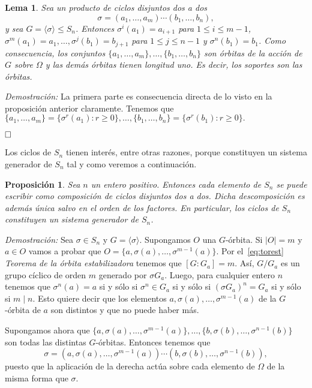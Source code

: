 \documentclass[12pt]{article}
\newtheorem{proposition}[theorem]{Proposición}
\newtheorem{lemma}{Lema}[theorem]
\begin{document}
\begin{lemma}Sea un producto de ciclos disjuntos dos a dos $$\sigma= (a_{1}, \ldots, a_{m}) \cdots (b_{1}, \ldots, b_{n}),$$ y sea $G =\langle \sigma \rangle \leq S_{n}$. Entonces $\sigma^{i}(a_{1}) = a_{i+1}$ para $1 \leq i \leq m-1$, $\sigma^{m}(a_{1})=a_{1}, \ldots, \sigma^{j}(b_{1})=b_{j+1}$ para $1 \leq j \leq n-1$ y $\sigma^{n}(b_{1})=b_{1}$. Como consecuencia, los conjuntos $\lbrace a_{1}, \ldots, a_{m} \rbrace, \ldots, \lbrace b_{1}, \ldots, b_{n}\rbrace$ son órbitas de la acción de $G$ sobre $\Omega$ y las demás órbitas tienen longitud uno. Es decir, los soportes son las órbitas.
\end{lemma}
\emph{Demostración: }
La primera parte es consecuencia directa de lo visto en la proposición anterior claramente. Tenemos que $\lbrace a_{1}, \ldots, a_{m} \rbrace = \lbrace \sigma^{r}(a_{1}) : r \geq 0 \rbrace, \ldots, \lbrace b_{1}, \ldots, b_{n} \rbrace = \lbrace \sigma^{r}(b_{1}) : r \geq 0 \rbrace.$

$\hfill \square$

Los ciclos de $S_{n}$ tienen interés, entre otras razones, porque constituyen un sistema generador de $S_{n}$ tal y como veremos a continuación.

\begin{proposition}\label{eq:ciclosdis} Sea $n$ un entero positivo. Entonces cada elemento de $S_{n}$ se puede escribir como composición de ciclos disjuntos dos a dos. Dicha descomposición es además única salvo en el orden de los factores. En particular, los ciclos de $S_{n}$ constituyen un sistema generador de $S_{n}$.
\end{proposition}
\emph{Demostración: } 
Sea $\sigma \in S_{n}$ y $G= \langle \sigma \rangle$. Supongamos $O$ una $G$-órbita. Si $|O| = m$ y $a \in O$ vamos a probar que $O = \lbrace a, \sigma(a), \ldots, \sigma^{m-1}(a) \rbrace$. Por el~\ref{eq:torest} \textit{Teorema de la órbita estabilizadora} tenemos que $[G:G_{a}] = m$. Así, $G/G_{a}$ es un grupo cíclico de orden $m$ generado por $\sigma G_{a}$. Luego, para cualquier entero $n$ tenemos que $\sigma^{n}(a) = a$ si y sólo si $\sigma^{n}\in G_{a}$ si y sólo si $(\sigma G_{a})^{n} = G_{a}$ si y sólo si $m \mid n$. Esto quiere decir que los elementos $a, \sigma(a), \ldots, \sigma^{m-1}(a)$ de la $G$-órbita de $a$ son distintos y que no puede haber más.

Supongamos ahora que $\lbrace a, \sigma(a), \ldots, \sigma^{m-1}(a) \rbrace, \ldots, \lbrace b, \sigma(b), \ldots, \sigma^{n-1}(b) \rbrace$ son todas las distintas $G$-órbitas. Entonces tenemos que $$\sigma = (a, \sigma(a), \ldots, \sigma^{m-1}(a))\cdots (b, \sigma(b), \ldots, \sigma^{n-1}(b)),$$ puesto que la aplicación de la derecha actúa sobre cada elemento de $\Omega$ de la misma forma que $\sigma$.
\end{document}
